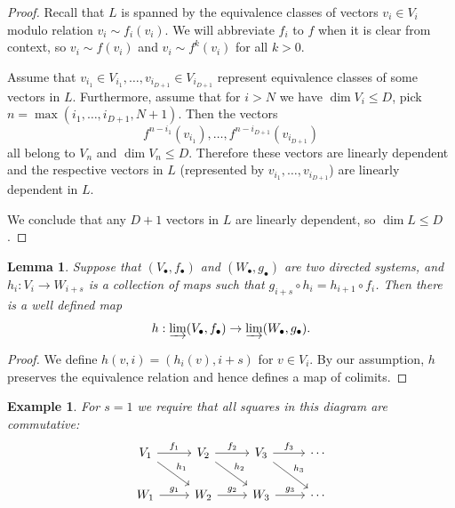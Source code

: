 \documentclass{amsart}
\newtheorem{lemma}[theorem]{Lemma}
\newtheorem{example}[theorem]{Example}
\begin{document}
\begin{proof}
Recall that $L$ is spanned by the equivalence classes of vectors $v_i\in V_i$ modulo relation $v_i\sim f_i(v_i)$. We will abbreviate $f_i$ to $f$ when it is clear from context, so $v_i\sim f(v_i)$ and $v_i\sim f^k(v_i)$ for all $k>0$.

Assume that $v_{i_1}\in V_{i_1},\ldots, v_{i_{D+1}}\in V_{i_{D+1}}$ represent equivalence classes of some vectors in $L$. Furthermore, assume that for $i>N$ we have $\dim V_i\le D$, pick $n=\max(i_1,\ldots,i_{D+1},N+1)$. Then the vectors
$$
f^{n-i_1}(v_{i_1}),\ldots, f^{n-i_{D+1}}(v_{i_{D+1}})
$$
all belong to $V_n$ and $\dim V_n\le D$. Therefore these vectors are linearly dependent and the respective vectors in $L$ (represented by $v_{i_1},\ldots,v_{i_{D+1}}$) are linearly dependent in $L$.

We conclude that any $D+1$ vectors in $L$ are linearly dependent, so $\dim L\le D$.
\end{proof}

\begin{lemma}
\label{lem: colimit action}
Suppose that $(V_{\bullet},f_{\bullet})$ and  $(W_{\bullet},g_{\bullet})$ are two directed systems, and $h_i:V_i\to W_{i+s}$ is a collection of maps such that $g_{i+s}\circ h_i=h_{i+1}\circ f_i$. Then there is a well defined map
$$
h:\varinjlim(V_{\bullet},f_{\bullet})\to \varinjlim(W_{\bullet},g_{\bullet}).
$$
\end{lemma}

\begin{proof}
We define $h(v,i)=(h_i(v),i+s)$ for $v\in V_i$. By our assumption, $h$ preserves the equivalence relation and hence defines a map of colimits.    
\end{proof}

\begin{example}
For $s=1$ we require that all squares in this diagram are commutative:
$$
\begin{tikzcd}
V_1 \arrow{r}{f_1} \arrow{dr}{h_1}& V_2 \arrow{r}{f_2} \arrow{dr}{h_2}& V_3 \arrow{r}{f_3} \arrow{dr}{h_3}& \cdots\\
W_1 \arrow{r}{g_1}& W_2 \arrow{r}{g_2}& W_3 \arrow{r}{g_3}& \cdots
\end{tikzcd}
$$
\end{example}

\end{document}
